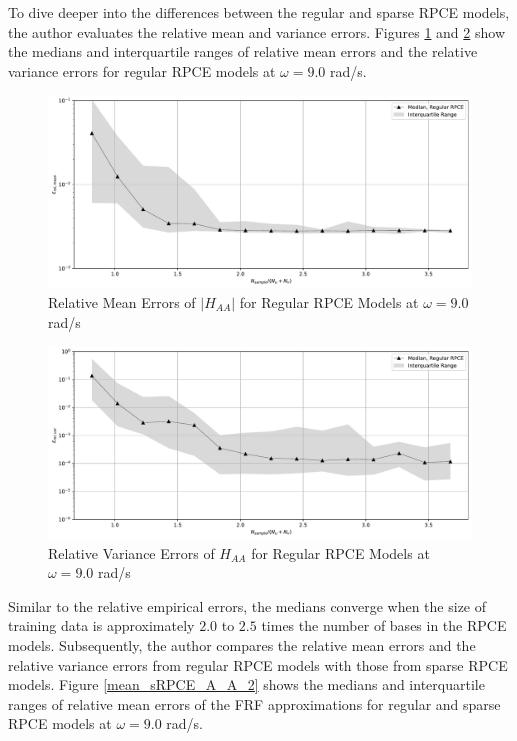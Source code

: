 To dive deeper into the differences between the regular and sparse RPCE models, the author evaluates the relative mean and variance errors.
Figures \ref{mean_rRPCE_A_A_2} and \ref{var_rRPCE_A_A_2} show the medians and interquartile ranges of relative mean errors and the relative variance errors for regular RPCE models at $\omega=9.0$ rad/s.
\begin{figure}[H]
    \centering
    \includegraphics[width=1.0\textwidth]{
        plots/surrogate/plot_2P_A_2.pdf
    }
    \caption{%
        Relative Mean Errors of $\left|H_{AA}\right|$ for Regular RPCE Models at $\omega=9.0$ rad/s
    }
    \label{mean_rRPCE_A_A_2}
\end{figure}
\begin{figure}[H]
    \centering
    \includegraphics[width=1.0\textwidth]{
        plots/surrogate/plot_3P_A_2.pdf
    }
    \caption{%
        Relative Variance Errors of $H_{AA}$ for Regular RPCE Models at $\omega=9.0$ rad/s
    }
    \label{var_rRPCE_A_A_2}
\end{figure}
Similar to the relative empirical errors, the medians converge when the size of training data is approximately $2.0$ to $2.5$ times the number of bases in the RPCE models.
Subsequently, the author compares the relative mean errors and the relative variance errors from regular RPCE models with those from sparse RPCE models.
Figure \ref{mean_sRPCE_A_A_2} shows the medians and interquartile ranges of relative mean errors of the FRF approximations for regular and sparse RPCE models at $\omega=9.0$ rad/s.
